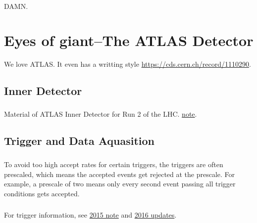 \begin{savequote}[75mm]
DAMN.
\end{savequote}

\chapter{Eyes of giant--The ATLAS Detector}

We love ATLAS. It even has a writting style \href{guide}{https://cds.cern.ch/record/1110290}.

\section{Inner Detector}
\paragraph{}
Material of ATLAS Inner Detector for Run 2 of the LHC. \href{https://cds.cern.ch/record/2260595/files/PERF-2015-07-002.pdf}{note}.


\section{Trigger and Data Aquasition}
\paragraph{}
To avoid too high accept rates for certain triggers, the triggers are often prescaled, which means the accepted events get rejected at the prescale. For example, a prescale of two means only every second event passing all trigger conditions gets accepted. 

\paragraph{}
For trigger information, see \href{http://atlas.web.cern.ch/Atlas/GROUPS/PHYSICS/PAPERS/TRIG-2016-01/}{2015 note} and \href{https://cds.cern.ch/record/2242069/files/ATL-DAQ-PUB-2017-001.pdf}{2016 updates}.